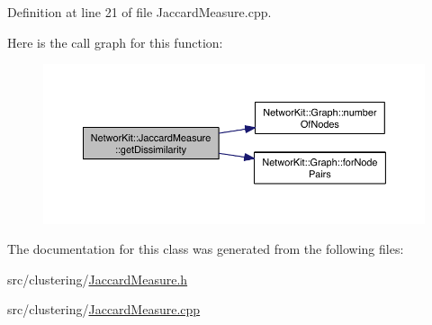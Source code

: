 Definition at line 21 of file Jaccard\-Measure.\-cpp.



Here is the call graph for this function\-:\nopagebreak
\begin{figure}[H]
\begin{center}
\leavevmode
\includegraphics[width=350pt]{class_networ_kit_1_1_jaccard_measure_aff4bd8b51e95bc96b8dd4d916e1b186a_cgraph}
\end{center}
\end{figure}




The documentation for this class was generated from the following files\-:\begin{DoxyCompactItemize}
\item 
src/clustering/\hyperlink{_jaccard_measure_8h}{Jaccard\-Measure.\-h}\item 
src/clustering/\hyperlink{_jaccard_measure_8cpp}{Jaccard\-Measure.\-cpp}\end{DoxyCompactItemize}

